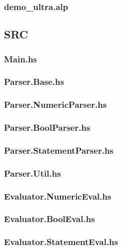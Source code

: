 \documentclass[a4paper,10pt]{article}
\begin{document}
\subsubsection{demo\_ultra.alp}

\subsection{SRC}
\subsubsection{Main.hs}

\subsubsection{Parser.Base.hs}

\subsubsection{Parser.NumericParser.hs}

\subsubsection{Parser.BoolParser.hs}

\subsubsection{Parser.StatementParser.hs}

\subsubsection{Parser.Util.hs}

\subsubsection{Evaluator.NumericEval.hs}

\subsubsection{Evaluator.BoolEval.hs}

\subsubsection{Evaluator.StatementEval.hs}

\end{document}
